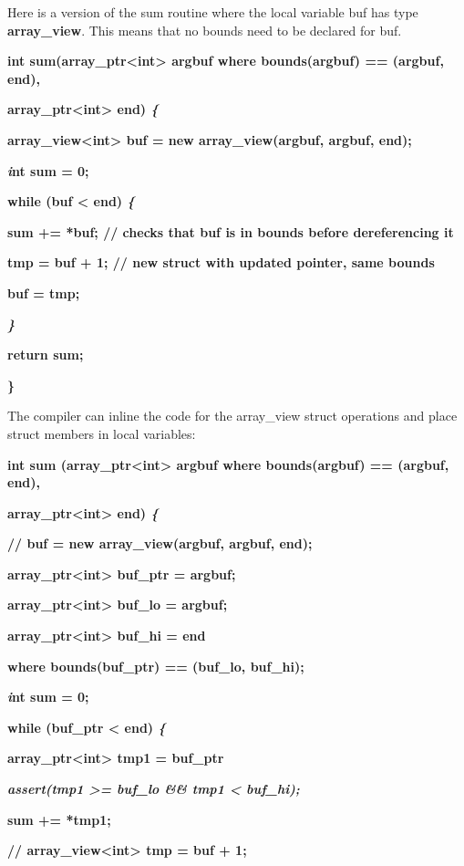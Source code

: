 \documentclass[]{article}
\begin{document}
Here is a version of the sum routine where the local variable buf has
type \textbf{array\_view}. This means that no bounds need to be declared
for buf.

\textbf{int sum(array\_ptr\textless{}int\textgreater{} argbuf where
bounds(argbuf) == (argbuf, end), }

\textbf{array\_ptr\textless{}int\textgreater{} end) \emph{\{}}

\textbf{array\_view\textless{}int\textgreater{} buf = new
array\_view(argbuf, argbuf, end);}

\textbf{\emph{i}nt sum = 0;}

\textbf{while (buf \textless{} end) \emph{\{}}

\textbf{sum += *buf; // checks that buf is in bounds before
dereferencing it }

\textbf{tmp = buf + 1; // new struct with updated pointer, same bounds}

\textbf{buf = tmp;}

\emph{\textbf{\}}}

\textbf{return sum;}

\textbf{\}}

The compiler can inline the code for the array\_view struct operations
and place struct members in local variables:

\textbf{int sum (array\_ptr\textless{}int\textgreater{} argbuf where
bounds(argbuf) == (argbuf, end),}

\textbf{array\_ptr\textless{}int\textgreater{} end) \emph{\{}}

\textbf{// buf = new array\_view(argbuf, argbuf, end);}

\textbf{array\_ptr\textless{}int\textgreater{} buf\_ptr = argbuf; }

\textbf{array\_ptr\textless{}int\textgreater{} buf\_lo = argbuf;}

\textbf{array\_ptr\textless{}int\textgreater{} buf\_hi = end}

\textbf{where bounds(buf\_ptr) == (buf\_lo, buf\_hi);}

\textbf{\emph{i}nt sum = 0;}

\textbf{while (buf\_ptr \textless{} end) \emph{\{}}

\textbf{array\_ptr\textless{}int\textgreater{} tmp1 = buf\_ptr}

\emph{\textbf{assert(tmp1 \textgreater{}= buf\_lo \&\& tmp1 \textless{}
buf\_hi);}}

\textbf{sum += *tmp1;}

\textbf{// array\_view\textless{}int\textgreater{} tmp = buf + 1;}
\end{document}
